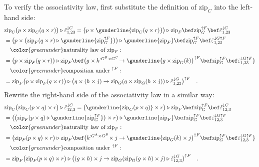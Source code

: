To verify the associativity law, first substitute the definition of
$\text{zip}_{C}$ into the left-hand side:
\begin{align*}
 & \text{zip}_{C}\big(p\times\text{zip}_{C}(q\times r)\big)\triangleright\tilde{\varepsilon}_{1,23}^{\downarrow C}=\big(p\times\gunderline{\text{zip}_{C}(q\times r)}\big)\triangleright\text{zip}_{F}\bef\text{zip}_{G}^{\uparrow F}\bef\tilde{\varepsilon}_{1,23}^{\downarrow C}\\
 & =\big(p\times\big(\text{zip}_{F}(q\times r)\triangleright\gunderline{\text{zip}_{G}^{\uparrow F}}\big)\big)\triangleright\gunderline{\text{zip}_{F}}\bef\text{zip}_{G}^{\uparrow F}\bef\tilde{\varepsilon}_{1,23}^{\downarrow G\uparrow F}\\
 & \quad{\color{greenunder}\text{naturality law of }\text{zip}_{F}:}\quad\\
 & =\big(p\times\text{zip}_{F}(q\times r)\big)\triangleright\text{zip}_{F}\bef\big(g\times k^{:G^{B}\times G^{C}}\!\rightarrow\gunderline{g\times\text{zip}_{G}(k)\big)^{\uparrow F}\bef\text{zip}_{G}^{\uparrow F}\bef\tilde{\varepsilon}_{1,23}^{\downarrow G\uparrow F}}\\
 & \quad{\color{greenunder}\text{composition under }^{\uparrow F}:}\quad\\
 & =\text{zip}_{F}\big(p\times\text{zip}_{F}(q\times r)\big)\triangleright\big(g\times(h\times j)\rightarrow\text{zip}_{G}(g\times\text{zip}_{G}(h\times j))\triangleright\tilde{\varepsilon}_{1,23}^{\downarrow G}\big)^{\uparrow F}\quad.
\end{align*}
Rewrite the right-hand side of the associativity law in a similar
way:
\begin{align*}
 & \text{zip}_{C}\big(\text{zip}_{C}(p\times q)\times r\big)\triangleright\tilde{\varepsilon}_{12,3}^{\downarrow C}=\big(\gunderline{\text{zip}_{C}(p\times q)}\times r\big)\triangleright\text{zip}_{F}\bef\text{zip}_{G}^{\uparrow F}\bef\tilde{\varepsilon}_{12,3}^{\downarrow C}\\
 & =\big(\big(\text{zip}_{F}(p\times q)\triangleright\gunderline{\text{zip}_{G}^{\uparrow F}}\big)\times r\big)\triangleright\gunderline{\text{zip}_{F}}\bef\text{zip}_{G}^{\uparrow F}\bef\tilde{\varepsilon}_{12,3}^{\downarrow G\uparrow F}\\
 & \quad{\color{greenunder}\text{naturality law of }\text{zip}_{F}:}\quad\\
 & =\big(\text{zip}_{F}(p\times q)\times r\big)\triangleright\text{zip}_{F}\bef\big(k^{:G^{A}\times G^{B}}\!\times j\rightarrow\gunderline{\text{zip}_{G}(k)\times j\big)^{\uparrow F}\bef\text{zip}_{G}^{\uparrow F}\bef\tilde{\varepsilon}_{12,3}^{\downarrow G\uparrow F}}\\
 & \quad{\color{greenunder}\text{composition under }^{\uparrow F}:}\quad\\
 & =\text{zip}_{F}\big(\text{zip}_{F}(p\times q)\times r\big)\triangleright\big((g\times h)\times j\rightarrow\text{zip}_{G}(\text{zip}_{G}(g\times h)\times j)\triangleright\tilde{\varepsilon}_{12,3}^{\downarrow G}\big)^{\uparrow F}\quad.
\end{align*}
